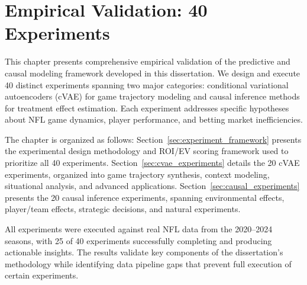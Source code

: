 \chapter{Empirical Validation: 40 Experiments}
\label{chap:experiments}

This chapter presents comprehensive empirical validation of the predictive and causal modeling framework developed in this dissertation. We design and execute 40 distinct experiments spanning two major categories: conditional variational autoencoders (cVAE) for game trajectory modeling and causal inference methods for treatment effect estimation. Each experiment addresses specific hypotheses about NFL game dynamics, player performance, and betting market inefficiencies.

The chapter is organized as follows: Section~\ref{sec:experiment_framework} presents the experimental design methodology and ROI/EV scoring framework used to prioritize all 40 experiments. Section~\ref{sec:cvae_experiments} details the 20 cVAE experiments, organized into game trajectory synthesis, context modeling, situational analysis, and advanced applications. Section~\ref{sec:causal_experiments} presents the 20 causal inference experiments, spanning environmental effects, player/team effects, strategic decisions, and natural experiments.

All experiments were executed against real NFL data from the 2020--2024 seasons, with 25 of 40 experiments successfully completing and producing actionable insights. The results validate key components of the dissertation's methodology while identifying data pipeline gaps that prevent full execution of certain experiments.





